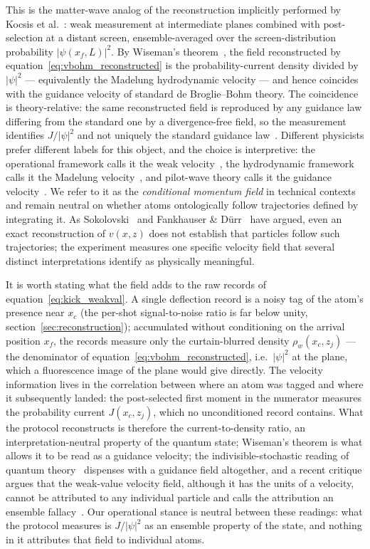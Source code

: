 \documentclass[11pt,a4paper]{article}
\begin{document}
This is the matter-wave analog of the reconstruction implicitly performed by Kocsis et al.~\cite{Kocsis2011}: weak measurement at intermediate planes combined with post-selection at a distant screen, ensemble-averaged over the screen-distribution probability $|\psi(x_f, L)|^2$. By Wiseman's theorem~\cite{Wiseman2007}, the field reconstructed by equation~\eqref{eq:vbohm_reconstructed} is the probability-current density divided by $|\psi|^2$ --- equivalently the Madelung hydrodynamic velocity --- and hence coincides with the guidance velocity of standard de Broglie--Bohm theory. The coincidence is theory-relative: the same reconstructed field is reproduced by any guidance law differing from the standard one by a divergence-free field, so the measurement identifies $J/|\psi|^2$ and not uniquely the standard guidance law~\cite{Leavens2005, DGZ2009, FankhauserDurr2021}. Different physicists prefer different labels for this object, and the choice is interpretive: the operational framework calls it the weak velocity~\cite{Wiseman2007}, the hydrodynamic framework calls it the Madelung velocity~\cite{Madelung1927}, and pilot-wave theory calls it the guidance velocity~\cite{deBroglie1927, Bohm1952a}. We refer to it as the \emph{conditional momentum field} in technical contexts and remain neutral on whether atoms ontologically follow trajectories defined by integrating it. As Sokolovski~\cite{Sokolovski2016} and Fankhauser \& D\"urr~\cite{FankhauserDurr2021} have argued, even an exact reconstruction of $v(x, z)$ does not establish that particles follow such trajectories; the experiment measures one specific velocity field that several distinct interpretations identify as physically meaningful.

It is worth stating what the field adds to the raw records of equation~\eqref{eq:kick_weakval}. A single deflection record is a noisy tag of the atom's presence near $x_c$ (the per-shot signal-to-noise ratio is far below unity, section~\ref{sec:reconstruction}); accumulated without conditioning on the arrival position $x_f$, the records measure only the curtain-blurred density $\rho_w(x_c, z_j)$ --- the denominator of equation~\eqref{eq:vbohm_reconstructed}, i.e.\ $|\psi|^2$ at the plane, which a fluorescence image of the plane would give directly. The velocity information lives in the correlation between where an atom was tagged and where it subsequently landed: the post-selected first moment in the numerator measures the probability current $J(x_c, z_j)$, which no unconditioned record contains. What the protocol reconstructs is therefore the current-to-density ratio, an interpretation-neutral property of the quantum state; Wiseman's theorem is what allows it to be read as a guidance velocity; the indivisible-stochastic reading of quantum theory~\cite{Barandes2025} dispenses with a guidance field altogether, and a recent critique argues that the weak-value velocity field, although it has the units of a velocity, cannot be attributed to any individual particle and calls the attribution an ensemble fallacy~\cite{Barandes2026}. Our operational stance is neutral between these readings: what the protocol measures is $J/|\psi|^2$ as an ensemble property of the state, and nothing in it attributes that field to individual atoms.
\end{document}
